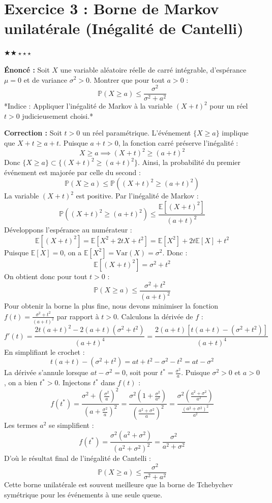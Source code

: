 \documentclass[11pt,a4paper]{article}
\begin{document}
\section*{Exercice 3 : Borne de Markov unilatérale (Inégalité de Cantelli)}

$\bigstar\bigstar\star\star\star$

\textbf{Énoncé :}
Soit $X$ une variable aléatoire réelle de carré intégrable, d'espérance $\mu = 0$ et de variance $\sigma^2 > 0$.
Montrer que pour tout $a > 0$ :
$$ \mathbb{P}(X \ge a) \le \frac{\sigma^2}{\sigma^2 + a^2} $$
*Indice : Appliquer l'inégalité de Markov à la variable $(X + t)^2$ pour un réel $t > 0$ judicieusement choisi.*

\textbf{Correction :}
Soit $t > 0$ un réel paramétrique.
L'événement $\{X \ge a\}$ implique que $X + t \ge a + t$. Puisque $a + t > 0$, la fonction carré préserve l'inégalité :
$$ X \ge a \implies (X + t)^2 \ge (a + t)^2 $$
Donc $\{X \ge a\} \subset \{(X + t)^2 \ge (a + t)^2\}$.
Ainsi, la probabilité du premier événement est majorée par celle du second :
$$ \mathbb{P}(X \ge a) \le \mathbb{P}((X + t)^2 \ge (a + t)^2) $$
La variable $(X + t)^2$ est positive. Par l'inégalité de Markov :
$$ \mathbb{P}((X + t)^2 \ge (a + t)^2) \le \frac{\mathbb{E}[(X + t)^2]}{(a + t)^2} $$
Développons l'espérance au numérateur :
$$ \mathbb{E}[(X + t)^2] = \mathbb{E}[X^2 + 2tX + t^2] = \mathbb{E}[X^2] + 2t\mathbb{E}[X] + t^2 $$
Puisque $\mathbb{E}[X] = 0$, on a $\mathbb{E}[X^2] = \text{Var}(X) = \sigma^2$. Donc :
$$ \mathbb{E}[(X + t)^2] = \sigma^2 + t^2 $$
On obtient donc pour tout $t > 0$ :
$$ \mathbb{P}(X \ge a) \le \frac{\sigma^2 + t^2}{(a + t)^2} $$
Pour obtenir la borne la plus fine, nous devons minimiser la fonction $f(t) = \frac{\sigma^2 + t^2}{(a + t)^2}$ par rapport à $t > 0$.
Calculons la dérivée de $f$ :
$$ f'(t) = \frac{2t(a + t)^2 - 2(a + t)(\sigma^2 + t^2)}{(a + t)^4} = \frac{2(a + t) [ t(a + t) - (\sigma^2 + t^2) ]}{(a + t)^4} $$
En simplifiant le crochet :
$$ t(a + t) - (\sigma^2 + t^2) = at + t^2 - \sigma^2 - t^2 = at - \sigma^2 $$
La dérivée s'annule lorsque $at - \sigma^2 = 0$, soit pour $t^* = \frac{\sigma^2}{a}$.
Puisque $\sigma^2 > 0$ et $a > 0$, on a bien $t^* > 0$.
Injectons $t^*$ dans $f(t)$ :
$$ f(t^*) = \frac{\sigma^2 + \left(\frac{\sigma^2}{a}\right)^2}{\left(a + \frac{\sigma^2}{a}\right)^2} = \frac{\sigma^2 \left(1 + \frac{\sigma^2}{a^2}\right)}{\left( \frac{a^2 + \sigma^2}{a} \right)^2} = \frac{\sigma^2 \left(\frac{a^2 + \sigma^2}{a^2}\right)}{\frac{(a^2 + \sigma^2)^2}{a^2}} $$
Les termes $a^2$ se simplifient :
$$ f(t^*) = \frac{\sigma^2 (a^2 + \sigma^2)}{(a^2 + \sigma^2)^2} = \frac{\sigma^2}{a^2 + \sigma^2} $$
D'où le résultat final de l'inégalité de Cantelli :
$$ \mathbb{P}(X \ge a) \le \frac{\sigma^2}{\sigma^2 + a^2} $$
Cette borne unilatérale est souvent meilleure que la borne de Tchebychev symétrique pour les événements à une seule queue.
\end{document}
